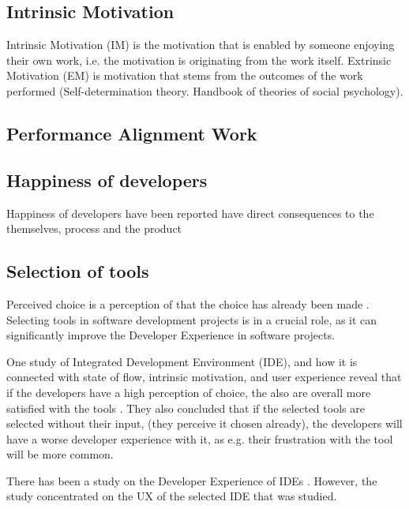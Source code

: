 \documentclass[english, 12pt, a4paper, sci, utf8, a-1b, online]{aaltothesis}
\begin{document}
\subsection{Intrinsic Motivation}

Intrinsic Motivation (IM) is the motivation that is enabled by someone enjoying their own work, i.e. the motivation is originating from the work itself. Extrinsic Motivation (EM) is motivation that stems from the outcomes of the work performed \citep{kuusinen-flow} (Self-determination theory. Handbook of theories of social psychology).

\subsection{Performance Alignment Work}


\subsection{Happiness of developers}

Happiness of developers have been reported have direct consequences to the themselves, process and the product \citep{unhappy-developers}

\subsection{Selection of tools}

Perceived choice is a perception of that the choice has already been made \citep{kuusinen-flow}. Selecting tools in software development projects is in a crucial role, as it can significantly improve the Developer Experience in software projects.

One study of Integrated Development Environment (IDE), and how it is connected with state of flow, intrinsic motivation, and user experience reveal that if the developers have a high perception of choice, the also are overall more satisfied with the tools \citep{kuusinen-flow}. They also concluded that if the selected tools are selected without their input, (they perceive it chosen already), the developers will have a worse developer experience with it, as e.g. their frustration with the tool will be more common.

There has been a study on the Developer Experience of IDEs \citep{software-developers-as-users}. However, the study concentrated on the UX of the selected IDE that was studied.
\end{document}
